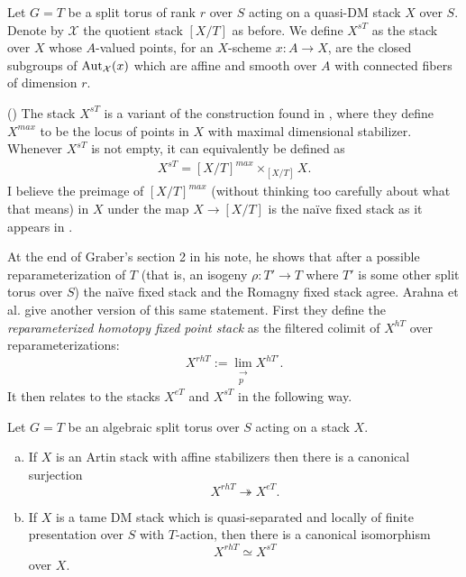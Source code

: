 \documentclass[12pt,dvipsnames]{amsart}
\begin{document}
\begin{definition}\label{rl-001E}\label{def:stabilizer-fixed-stack}
  Let \(G = T\) be a split torus of rank \(r\) over \(S\) acting on a quasi-DM stack \(X\) over \(S\). Denote by \(\mathcal X\) the quotient stack \([X/T]\) as before. We define \(X^{sT}\) as the stack over \(X\) whose \(A\)-valued points, for an \(X\)-scheme \(x:A\to X\), are the closed subgroups of \(\operatorname{Aut}_{\mathcal X}(x)\) which are affine and smooth over \(A\) with connected fibers of dimension \(r\).
\end{definition}
\begin{remark}\label{rl-001F}
(\cite[Remark A.44]{aranha-khan-latyntsev-etal_VirtualLocalizationRevisited2025})
  The stack \(X^{sT}\) is a variant of the construction found in \cite[Proposition C.5]{edidin-rydh_CanonicalReductionStabilizers2021}, where they define \(X^{max}\) to be the locus of points in \(X\) with maximal dimensional stabilizer. Whenever \(X^{sT}\) is not empty, it can equivalently be defined as
  \begin{align*}
    X^{sT} = [X/T]^{max} \times_{[X/T]} X.
  \end{align*}
  I believe the preimage of \([X/T]^{max}\) (without thinking too carefully about what that means) in \(X\) under the map \(X\to [X/T]\) is the na\"ive fixed stack as it appears in \cite{graber-pandharipande_LocalizationVirtualClasses1999}.
\end{remark}

At the end of Graber's section 2 in his note, he shows that after a possible reparameterization of \(T\) (that is, an isogeny \(\rho:T'\to T\) where \(T'\) is some other split torus over \(S\)) the na\"ive fixed stack and the Romagny fixed stack agree. Arahna et al. give another version of this same statement. First they define the \emph{reparameterized homotopy fixed point stack} as the filtered colimit of \(X^{hT}\) over reparameterizations:
\[X^{rhT} := \lim_{\substack{\to \\ p}} X^{hT'}.\]
It then relates to the stacks \(X^{eT}\) and \(X^{sT}\) in the following way.

\begin{theorem}\label{rl-001G}\label{thm:reconciliation-of-fixed-stacks-for-tori}
  Let \(G = T\) be an algebraic split torus over \(S\) acting on a stack \(X\).
  \begin{enumerate}[(a)]
    \item If \(X\) is an Artin stack with affine stabilizers then there is a canonical surjection
          \[X^{rhT}\twoheadrightarrow X^{eT}.\]
    \item If \(X\) is a tame DM stack which is quasi-separated and locally of finite presentation over \(S\) with \(T\)-action, then there is a canonical isomorphism
          \[X^{rhT} \simeq X^{sT}\]
    over \(X\).
  \end{enumerate}

\end{theorem}



\newpage

\printbibliography
\end{document}
